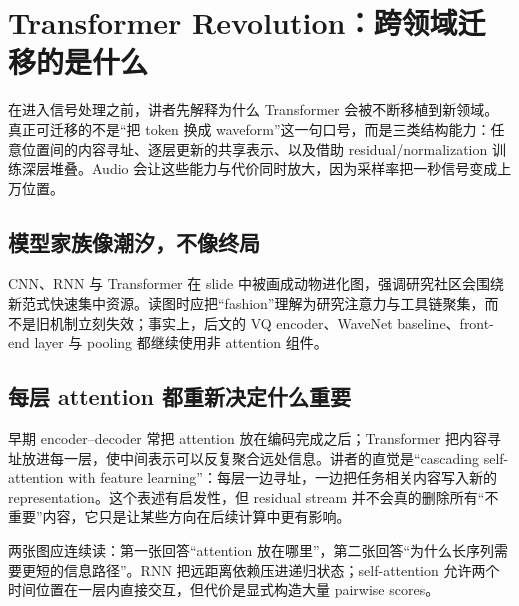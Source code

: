 \section{Transformer Revolution：跨领域迁移的是什么}

在进入信号处理之前，讲者先解释为什么 Transformer 会被不断移植到新领域。真正可迁移的不是“把 token 换成 waveform”这一句口号，而是三类结构能力：任意位置间的内容寻址、逐层更新的共享表示、以及借助 residual/normalization 训练深层堆叠。Audio 会让这些能力与代价同时放大，因为采样率把一秒信号变成上万位置。

\subsection{模型家族像潮汐，不像终局}

CNN、RNN 与 Transformer 在 slide 中被画成动物进化图，强调研究社区会围绕新范式快速集中资源。读图时应把“fashion”理解为研究注意力与工具链聚集，而不是旧机制立刻失效；事实上，后文的 VQ encoder、WaveNet baseline、front-end layer 与 pooling 都继续使用非 attention 组件。



\subsection{每层 attention 都重新决定什么重要}

早期 encoder--decoder 常把 attention 放在编码完成之后；Transformer 把内容寻址放进每一层，使中间表示可以反复聚合远处信息。讲者的直觉是“cascading self-attention with feature learning”：每层一边寻址，一边把任务相关内容写入新的 representation。这个表述有启发性，但 residual stream 并不会真的删除所有“不重要”内容，它只是让某些方向在后续计算中更有影响。



两张图应连续读：第一张回答“attention 放在哪里”，第二张回答“为什么长序列需要更短的信息路径”。RNN 把远距离依赖压进递归状态；self-attention 允许两个时间位置在一层内直接交互，但代价是显式构造大量 pairwise scores。

